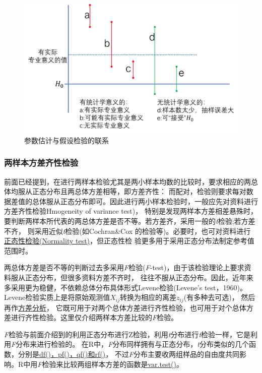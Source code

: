 \documentclass[
]{article}
\begin{document}
\begin{figure}

{\centering \includegraphics[width=0.49\linewidth,height=0.49\textheight]{image/ieandht} 

}

\caption{参数估计与假设检验的联系}\label{fig:Ieandht}
\end{figure}

\hypertarget{ux4e24ux6837ux672cux65b9ux5deeux9f50ux6027ux68c0ux9a8c}{%
\subsubsection{两样本方差齐性检验}\label{ux4e24ux6837ux672cux65b9ux5deeux9f50ux6027ux68c0ux9a8c}}

前面已经提到，在进行两样本检验尤其是两小样本均数的比较时，要求相应的两总体均服从正态分布且两总体方差相等，即方差齐性：
而配对，检验则要求每对数据差值的总体服从正态分布即可。因此进行两小样本检验时，一般应先对资料进行方差齐性检验Hmogeneity of variance test)，
特别是发现两样本方差相差悬殊时，要判断两样本所代表的两总体方差是否不等。若方差齐，采用一般的\emph{t}检验;若方差不齐，
则采用近似\emph{t}检验(如Cochran\&Cox 的检验等)。必要时，也可对资料进行 \protect\hyperlink{ux6b63ux6001ux68c0ux9a8c}{正态性检验(Normality test)}，但正态性检
验更多用于采用正态分布法制定参考值范围时。

两总体方差是否不等的判断过去多采用\emph{F}检验(\emph{F}-test)，由于该检验理论上要求资料服从正态分布，但很多资料方差不齐时，
往往不服从正态分布。因此，近年来多采用更为稳健，不依赖总体分布具体形式Levene检验(Levene's test，1960)。
Levene检验实质上是将原始观测值\(X_{ij}\)转换为相应的离差\(z_{ij}\)(有多种去可选)，
然后再作\href{https://zh.wikipedia.org/zh/\%E6\%96\%B9\%E5\%B7\%AE\%E5\%88\%86\%E6\%9E\%90}{方差分析}，
它既可用于对两个总体方差进行齐性检验，也可用于对个总体方差进行齐性检验。这里仅介绍两样本方差比较的\emph{F}检验。

\emph{F}检验与前面介绍到的利用正态分布进行Z检验，利用\emph{t}分布进行\emph{t}检验一样，它是利用\emph{F}分布来进行检验的。
在R中，\emph{F}分布同样拥有与正态分布，\emph{t}分布类似的几个函数，分别是\href{https://stat.ethz.ch/R-manual/R-devel/library/stats/html/Fdist.html}{df()，pf()，qf()和rf()}，
不过\emph{F}分布主要收两组样品的自由度共同影响。R中用\emph{F}检验来比较两组样本方差的函数是\href{https://www.rdocumentation.org/packages/stats/versions/3.6.2/topics/var.test}{var.test()}。
\end{document}

